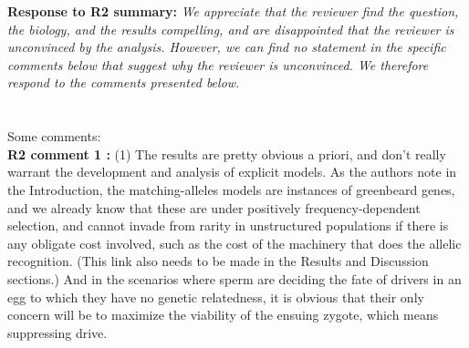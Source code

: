 \documentclass[12pt,letterpaper]{article}
\begin{document}
{\bf{Response to R2 summary:}} \emph{We appreciate that the reviewer find the question, the biology, and the results compelling, and are disappointed that the reviewer is unconvinced by the analysis. However, we can find no statement in the specific comments below that suggest why the reviewer is unconvinced. We therefore respond to the comments presented below.}
\\
\\
\\
Some comments:
\\
{\bf{R2 comment 1 :}}
(1) The results are pretty obvious a priori, and don't really warrant the development and analysis of explicit models. As the authors note in the Introduction, the matching-alleles models are instances of greenbeard genes, and we already know that these are under positively frequency-dependent selection, and cannot invade from rarity in unstructured populations if there is any obligate cost involved, such as the cost of the machinery that does the allelic recognition. (This link also needs to be made in the Results and Discussion sections.) And in the scenarios where sperm are deciding the fate of drivers in an egg to which they have no genetic relatedness, it is obvious that their only concern will be to maximize the viability of the ensuing zygote, which means suppressing drive.
\end{document}
